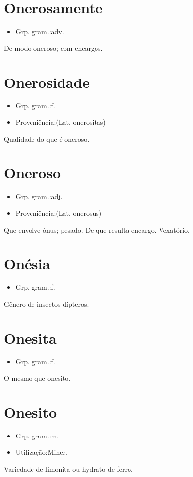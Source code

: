 \section{Onerosamente}
\begin{itemize}
\item {Grp. gram.:adv.}
\end{itemize}
De modo oneroso; com encargos.
\section{Onerosidade}
\begin{itemize}
\item {Grp. gram.:f.}
\end{itemize}
\begin{itemize}
\item {Proveniência:(Lat. \textunderscore onerositas\textunderscore )}
\end{itemize}
Qualidade do que é oneroso.
\section{Oneroso}
\begin{itemize}
\item {Grp. gram.:adj.}
\end{itemize}
\begin{itemize}
\item {Proveniência:(Lat. \textunderscore onerosus\textunderscore )}
\end{itemize}
Que envolve ónus; pesado.
De que resulta encargo.
Vexatório.
\section{Onésia}
\begin{itemize}
\item {Grp. gram.:f.}
\end{itemize}
Gênero de insectos dípteros.
\section{Onesita}
\begin{itemize}
\item {Grp. gram.:f.}
\end{itemize}
O mesmo que \textunderscore onesito\textunderscore .
\section{Onesito}
\begin{itemize}
\item {Grp. gram.:m.}
\end{itemize}
\begin{itemize}
\item {Utilização:Miner.}
\end{itemize}
Variedade de limonita ou hydrato de ferro.
